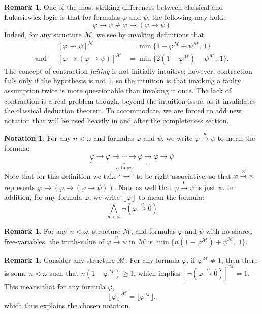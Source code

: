 \documentclass{amsart}
\theoremstyle{definition}
\newtheorem{remark}[theorem]{Remark}
\newtheorem{notation}[theorem]{Notation}
\numberwithin{equation}{theorem}
\renewcommand{\phi}{\varphi}
\newcommand{\strict}[1]{{\left\lfloor#1\right\rfloor}}
\newcommand{\rat}[1]{{\overline{#1}}}
\newcommand{\narrow}[1]{\xrightarrow{#1}}
\renewcommand{\to}{\narrow{}}
\begin{document}
\begin{remark}
  One of the most striking differences between classical and {\L}ukasiewicz logic is that for formulas $\phi$ and $\psi$, the following may hold:
  \[
    \phi\to\psi\not\equiv \phi\to(\phi\to\psi)
  \]
  Indeed, for any structure $\mathcal M$, we see by invoking definitions that
  \begin{align*}
    &&[\phi\to\psi]^\mathcal M&=\min\{1-\phi^\mathcal M+\psi^\mathcal M,\ 1\}\\
    \text{and}&&[\phi\to(\phi\to\psi)]^\mathcal M&=\min\{2(1-\phi^\mathcal M)+\psi^\mathcal M,\ 1\}.
  \end{align*}
  The concept of contraction \emph{failing} is not initially intuitive; however, contraction fails only if the hypothesis is not 1, so the intuition is that invoking a faulty assumption twice is more questionable than invoking it once.
  The lack of contraction is a real problem though, beyond the intuition issue, as it invalidates the classical deduction theorem.
  To accommodate, we are forced to add new notation that will be used heavily in and after the completeness section.
\end{remark}
\begin{notation}\label{not:strict}
  For any $n<\omega$ and formulas $\phi$ and $\psi$, we write $\phi\narrow n\psi$ to mean the formula:
  \[
    \underbrace{\phi\to\phi\to\cdots\to\phi\to\phi}_\text{$n$ times}\to\psi
  \]
  Note that for this definition we take `$\to$' to be right-associative, so that $\phi\narrow3\psi$ represents $\phi\to(\phi\to(\phi\to\psi))$.
  Note as well that $\phi\narrow 0\psi$ is just $\psi$.
  In addition, for any formula $\phi$, we write $\strict\phi$ to mean the formula:
  \[
    \bigwedge_{n<\omega}\neg(\phi\narrow n\rat 0)
  \]
\end{notation}
\begin{remark}
  For any $n<\omega$, structure $\mathcal M$, and formulas $\phi$ and $\psi$ with no shared free-variables, the truth-value of $\phi\narrow n\psi$ in $\mathcal M$ is $\min\{n(1-\phi^\mathcal M)+\psi^\mathcal M,\ 1\}$.
\end{remark}
\begin{remark}\label{rem:context-chain}
  Consider any structure $\mathcal M$.
  For any formula $\phi$, if $\phi^\mathcal M\neq 1$, then there is some $n<\omega$ such that $n(1-\phi^\mathcal M)\geq 1$, which implies $[\neg(\phi\narrow n\rat 0)]^\mathcal M=1$.
  This means that for any formula $\phi$,
  \[
    \strict{\phi}^\mathcal M=\lfloor\phi^\mathcal M\rfloor,
  \]
  which thus explains the chosen notation.
\end{remark}
\end{document}
